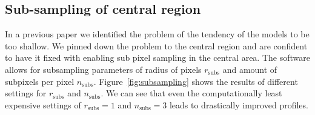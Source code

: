 \documentclass[fleqn,usenatbib]{mnras}
\newcommand{\figref}[1]{\ref{fig:#1}}
\begin{document}
\subsection{Sub-sampling of central region}\label{subsec:hires}

In a previous paper \cite{2015MNRAS.447.2170K} we identified the problem of the tendency of the models to be too shallow.
We pinned down the problem to the central region and are confident to have it fixed with enabling sub pixel sampling in the central area.
The software allows for subsampling parameters of radius of pixels $r_\text{subs}$ and amount of subpixels per pixel $n_\text{subs}$.
Figure~\figref{subsampling} shows the results of different settings for $r_\text{subs}$ and $n_\text{subs}$.
We can see that even the computationally least expensive settings of $r_\text{subs}=1$ and $n_\text{subs}=3$ leads to drastically improved profiles.
\end{document}
